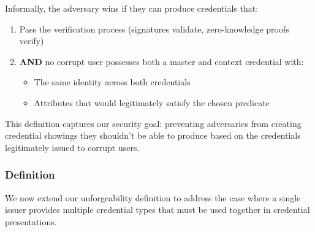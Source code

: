 Informally, the adversary wins if they can produce credentials that:
\begin{enumerate}
    \item Pass the verification process (signatures validate, zero-knowledge proofs verify)
    \item \textbf{AND} no corrupt user possesses both a master and context credential with:
    \begin{itemize}
        \item The same identity across both credentials
        \item Attributes that would legitimately satisfy the chosen predicate
    \end{itemize}
\end{enumerate}
This definition captures our security goal: preventing adversaries from creating credential showings they shouldn't be able to produce based on the credentials legitimately issued to corrupt users.



\clearpage
\subsubsection{Definition}

We now extend our unforgeability definition to address the case where a single issuer provides multiple credential types that must be used together in credential presentations.

